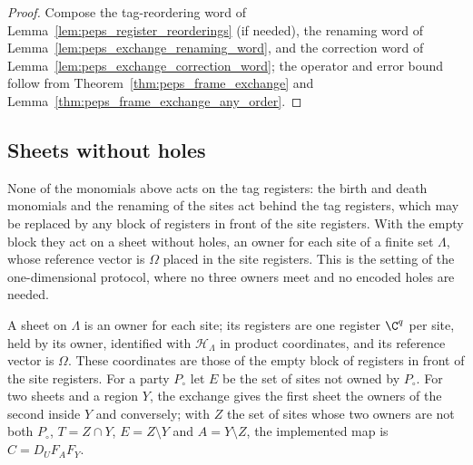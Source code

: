\begin{proof}\leanok
    Compose the tag-reordering word of Lemma~\ref{lem:peps_register_reorderings}
    (if needed), the renaming word of Lemma~\ref{lem:peps_exchange_renaming_word},
    and the correction word of Lemma~\ref{lem:peps_exchange_correction_word};
    the operator and error bound follow from Theorem~\ref{thm:peps_frame_exchange}
    and Lemma~\ref{thm:peps_frame_exchange_any_order}.
\end{proof}

\subsection{Sheets without holes}

None of the monomials above acts on the tag registers: the birth and death
monomials and the renaming of the sites act behind the tag registers, which may be
replaced by any block of registers in front of the site registers. With the
empty block they act on a sheet without holes, an owner for each site of a
finite set $\Lambda$, whose reference vector is $\Omega$ placed in the site
registers. This is the setting of the one-dimensional protocol, where no
three owners meet and no encoded holes are needed.

\begin{definition}
    \label{def:lattice_sheet}
    \leanok
    A sheet on $\Lambda$ is an owner for each site; its registers are one
    register $\C^q$ per site, held by its owner, identified with
    $\mathcal H_\Lambda$ in product coordinates, and its reference vector is
    $\Omega$. These coordinates are those of the empty block of registers in
    front of the site registers. For a party $P_\circ$ let $E$ be
    the set of sites not owned by $P_\circ$. For two sheets and a region $Y$,
    the exchange gives the first sheet the owners of the second inside $Y$ and
    conversely; with $Z$ the set of sites whose two owners are not both
    $P_\circ$, $T=Z\cap Y$, $E=Z\setminus Y$ and $A=Y\setminus Z$, the
    implemented map is $C=D_UF_AF_Y$.
\end{definition}

